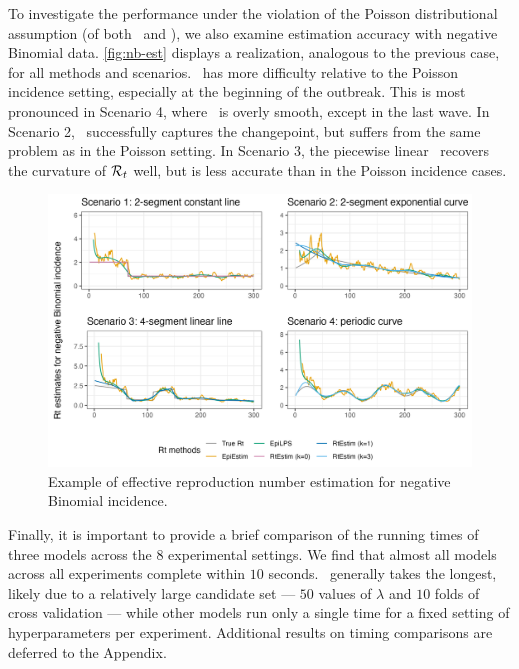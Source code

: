 To investigate the performance under the violation of the Poisson distributional
assumption (of both \RtEstim\ and \EpiEstim), we also examine estimation
accuracy with negative Binomial data. \autoref{fig:nb-est} displays a
realization, analogous to the previous case, for all methods and scenarios.
\RtEstim\ has more difficulty relative to the Poisson incidence setting,
especially at the beginning of the outbreak. This is most pronounced in Scenario
4, where \RtEstim\ is overly smooth, except in the last wave. In Scenario 2,
\RtEstim\ successfully captures the changepoint, but suffers from the same
problem as in the Poisson setting. In Scenario 3, the piecewise linear \RtEstim\
recovers the curvature of $\mathcal{R}_t$ well, but is less accurate than
in the Poisson incidence cases.

\begin{figure}[tb]
    \centering
    \includegraphics*[width=.99\textwidth]{fig/NB-res-plot.png}
    \caption{Example of effective reproduction number estimation for negative Binomial
    incidence.}
    \label{fig:nb-est}
\end{figure}

Finally, it is important to provide a brief comparison of the running times of
three models across the $8$ experimental settings. We find that almost all
models across all experiments complete within $10$ seconds.
\RtEstim\ generally takes the longest, likely due to a relatively large
candidate set --- $50$ values of $\lambda$ and $10$ folds of cross validation --- while
other models run only a single time for a fixed setting of hyperparameters per
experiment. Additional results on timing comparisons are deferred to the
Appendix. 


